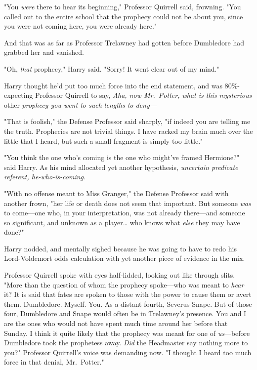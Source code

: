 "You \emph{were} there to hear its beginning," Professor Quirrell said,
frowning. "You called out to the entire school that the prophecy could not be
about you, since you were not coming here, you were already here."


And that was as far as Professor Trelawney had gotten before Dumbledore had
grabbed her and vanished.

"Oh, \emph{that} prophecy," Harry said. "Sorry! It went clear out of my mind."

Harry thought he'd put too much force into the end statement, and was
80\%-expecting Professor Quirrell to say, \emph{Aha, now Mr.~Potter, what is
this mysterious} other \emph{prophecy you went to such lengths to deny---}

"That is foolish," the Defense Professor said sharply, "if indeed you are
telling me the truth. Prophecies are not trivial things. I have racked my brain
much over the little that I heard, but such a small fragment is simply too
little."

"You think the one who's coming is the one who might've framed Hermione?" said
Harry. As his mind allocated yet another hypothesis, \emph{uncertain predicate
referent, he-who-is-coming.}

"With no offense meant to Miss Granger," the Defense Professor said with
another frown, "her life or death does not seem that important. But someone
\emph{was} to come---one who, in your interpretation, was not already
there---and someone so significant, and unknown as a player{\ldots} who knows
what \emph{else} they may have done?"

Harry nodded, and mentally sighed because he was going to have to redo his
Lord-Voldemort odds calculation with yet another piece of evidence in the mix.

Professor Quirrell spoke with eyes half-lidded, looking out like through slits.
"More than the question of whom the prophecy spoke---who was meant to
\emph{hear} it? It is said that fates are spoken to those with the power to
cause them or avert them. Dumbledore. Myself. You. As a distant fourth, Severus
Snape. But of those four, Dumbledore and Snape would often be in Trelawney's
presence. You and I are the ones who would not have spent much time around her
before that Sunday. I think it quite likely that the prophecy was meant for one
of \emph{us}---before Dumbledore took the prophetess away. \emph{Did} the
Headmaster say nothing more to you?" Professor Quirrell's voice was demanding
now. "I thought I heard too much force in that denial, Mr.~Potter."

